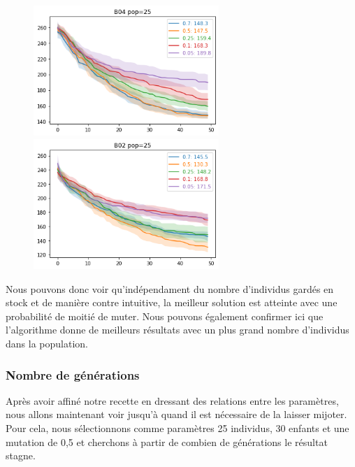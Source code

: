 \documentclass{article}
\begin{document}
\begin{figure}[H]
	\centerline{ \includegraphics[width=7cm]{images/B04mut25.png} \includegraphics[width=7cm]{images/B02mut25.png} } 
\end{figure}

Nous pouvons donc voir qu'indépendament du nombre d'individus gardés en stock et de manière contre intuitive, la meilleur solution est atteinte avec une probabilité de moitié de muter. Nous pouvons également confirmer ici que l'algorithme donne de meilleurs résultats avec un plus grand nombre d'individus dans la population.

\subsubsection{Nombre de générations}
Après avoir affiné notre recette en dressant des relations entre les paramètres, nous allons maintenant voir jusqu'à quand il est nécessaire de la laisser mijoter. Pour cela, nous sélectionnons comme paramètres 25 individus, 30 enfants et une mutation de 0,5 et cherchons à partir de combien de générations le résultat stagne.
\end{document}
